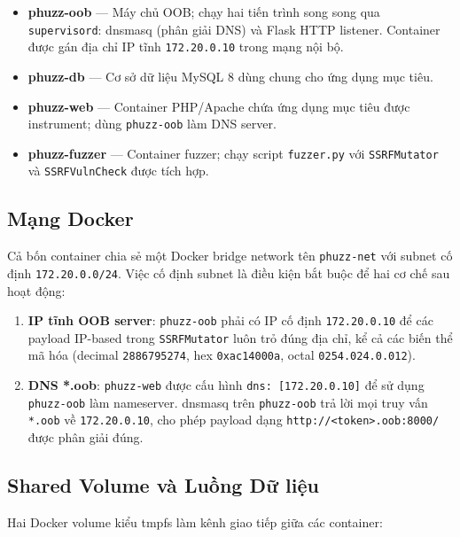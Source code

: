 \begin{itemize}
    \item \textbf{phuzz-oob} --- Máy chủ OOB; chạy hai tiến trình song song
    qua \texttt{supervisord}: dnsmasq (phân giải DNS) và Flask HTTP listener.
    Container được gán địa chỉ IP tĩnh \texttt{172.20.0.10} trong mạng nội bộ.
    \item \textbf{phuzz-db} --- Cơ sở dữ liệu MySQL 8 dùng chung cho ứng dụng
    mục tiêu.
    \item \textbf{phuzz-web} --- Container PHP/Apache chứa ứng dụng mục tiêu
    được instrument; dùng \texttt{phuzz-oob} làm DNS server.
    \item \textbf{phuzz-fuzzer} --- Container fuzzer; chạy script
    \texttt{fuzzer.py} với \texttt{SSRFMutator} và \texttt{SSRFVulnCheck} được
    tích hợp.
\end{itemize}

\subsection{Mạng Docker}

Cả bốn container chia sẻ một Docker bridge network tên \texttt{phuzz-net}
với subnet cố định \texttt{172.20.0.0/24}. Việc cố định subnet là điều kiện
bắt buộc để hai cơ chế sau hoạt động:

\begin{enumerate}
    \item \textbf{IP tĩnh OOB server}: \texttt{phuzz-oob} phải có IP cố định
    \texttt{172.20.0.10} để các payload IP-based trong
    \texttt{SSRFMutator} luôn trỏ đúng địa chỉ, kể cả các biến thể
    mã hóa (decimal \texttt{2886795274}, hex \texttt{0xac14000a}, octal
    \texttt{0254.024.0.012}).
    \item \textbf{DNS *.oob}: \texttt{phuzz-web} được cấu hình
    \texttt{dns: [172.20.0.10]} để sử dụng \texttt{phuzz-oob} làm nameserver.
    dnsmasq trên \texttt{phuzz-oob} trả lời mọi truy vấn \texttt{*.oob} về
    \texttt{172.20.0.10}, cho phép payload dạng
    \texttt{http://<token>.oob:8000/} được phân giải đúng.
\end{enumerate}

\subsection{Shared Volume và Luồng Dữ liệu}

Hai Docker volume kiểu tmpfs làm kênh giao tiếp giữa các container:

